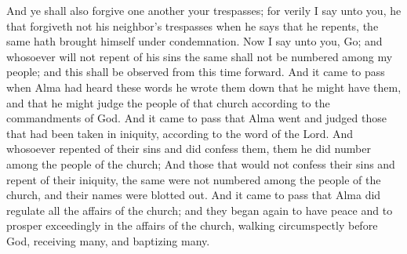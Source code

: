 And ye shall also forgive one another your trespasses; for verily I say unto you, he that forgiveth not his neighbor's trespasses when he says that he repents, the same hath brought himself under condemnation.
\bverse \iffalse Now I say unto you, Go; and whosoever will not repent of his sins the same shall not be numbered among my people; and this shall be observed from this time forward. \fi
Now I say unto you, Go; and whosoever will not repent of his sins the same shall not be numbered among my people; and this shall be observed from this time forward.
\bverse \iffalse And it came to pass when Alma had heard these words he wrote them down that he might have them, and that he might judge the people of that church according to the commandments of God. \fi
And it came to pass when Alma had heard these words he wrote them down that he might have them, and that he might judge the people of that church according to the commandments of God.
\bverse \iffalse And it came to pass that Alma went and judged those that had been taken in iniquity, according to the word of the Lord. \fi
And it came to pass that Alma went and judged those that had been taken in iniquity, according to the word of the Lord.
\bverse \iffalse And whosoever repented of their sins and did confess them, them he did number among the people of the church; \fi
And whosoever repented of their sins and did confess them, them he did number among the people of the church;
\bverse \iffalse And those that would not confess their sins and repent of their iniquity, the same were not numbered among the people of the church, and their names were blotted out. \fi
And those that would not confess their sins and repent of their iniquity, the same were not numbered among the people of the church, and their names were blotted out.
\bverse \iffalse And it came to pass that Alma did regulate all the affairs of the church; and they began again to have peace and to prosper exceedingly in the affairs of the church, walking circumspectly before God, receiving many, and baptizing many. \fi
And it came to pass that Alma did regulate all the affairs of the church; and they began again to have peace and to prosper exceedingly in the affairs of the church, walking circumspectly before God, receiving many, and baptizing many.
\bverse \iffalse And now all these things did Alma and his fellow laborers do who were over the church, walking in all diligence, teaching the word of God in all things, suffering all manner of afflictions, being persecuted by all those who did not belong to the church of God. \fi
